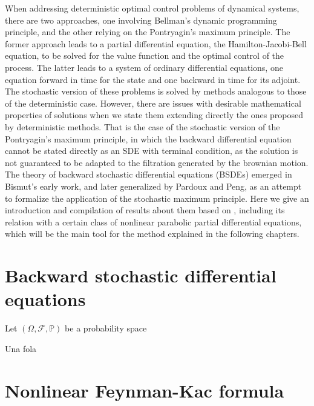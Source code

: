 When addressing deterministic optimal control problems of dynamical systems, there are two approaches, one involving Bellman's dynamic programming principle, and the other relying on the Pontryagin's maximum principle. The former approach leads to a partial differential equation, the Hamilton-Jacobi-Bell equation, to be solved for the value function and the optimal control of the process. The latter leads to a system of ordinary differential equations, one equation forward in time for the state and one backward in time for its adjoint.\\

The stochastic version of these problems is solved by methods analogous to those of the deterministic case. However, there are issues with desirable mathematical properties of solutions when we state them extending directly the ones proposed by deterministic methods. That is the case of the stochastic version of the Pontryagin's maximum principle, in which the backward differential equation cannot be stated directly as an SDE with terminal condition, as the solution is not guaranteed to be adapted to the filtration generated by the brownian motion.\\

The theory of backward stochastic differential equations (BSDEs) emerged in Bismut's \cite{bismut_conjugate_1973} early work, and later generalized by Pardoux and Peng\cite{pardoux_adapted_1990}, as an attempt to formalize the application of the stochastic maximum principle. Here we give an introduction and compilation of results about them based on \cite{zhang_backward_2017,pardoux_stochastic_2014,romero_maestro_nodate,touzi_optimal_2013}, including its relation with a certain class of nonlinear parabolic partial differential equations, which will be the main tool for the method explained in the following chapters.   

\section{Backward stochastic differential equations}
Let $(\Omega,\mathcal{F},\mathbb{P})$ be a probability space
\begin{definition}
	Una fola
\end{definition}
\section{Nonlinear Feynman-Kac formula}

 


